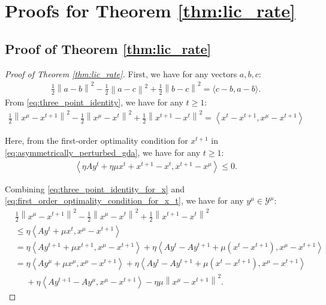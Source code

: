 \documentclass{article}
\newcommand{\Y}{\mathcal{Y}}
\theoremstyle{plain}
\begin{document}
\section{Proofs for Theorem \ref{thm:lic_rate}}
\label{sec:appx_proof_for_lic_rate}
\subsection{Proof of Theorem \ref{thm:lic_rate}}
\label{sec:appx_proof_of_lic_rate}
\begin{proof}[Proof of Theorem \ref{thm:lic_rate}]
    First, we have for any vectors $a, b, c$:
    \begin{align}
        \frac{1}{2}\left\|a - b\right\|^2 - \frac{1}{2}\left\|a - c\right\|^2 + \frac{1}{2}\left\|b - c\right\|^2 = \langle c - b , a - b\rangle.
        \label{eq:three_point_identity}
    \end{align}
    From \eqref{eq:three_point_identity}, we have for any $t\geq 1$:
    \begin{align}
        \frac{1}{2}\left\|x^{\mu} - x^{t+1}\right\|^2 - \frac{1}{2}\left\|x^{\mu} - x^t\right\|^2 + \frac{1}{2}\left\|x^{t+1} - x^t\right\|^2 = \left\langle x^t - x^{t+1}, x^{\mu} - x^{t+1}\right\rangle
        \label{eq:three_point_identity_for_x}
    \end{align}

    Here, from the first-order optimality condition for $x^{t+1}$ in \eqref{eq:asymmetrically_perturbed_gda}, we have for any $t\geq 1$:
    \begin{align}
        \left\langle \eta Ay^t + \eta\mu x^t + x^{t+1} - x^t, x^{t+1} - x^{\mu}\right\rangle \leq 0.
        \label{eq:first_order_optimality_condition_for_x_t}
    \end{align}

    Combining \eqref{eq:three_point_identity_for_x} and \eqref{eq:first_order_optimality_condition_for_x_t}, we have for any $y^{\mu}\in \Y^{\mu}$:
    \begin{align}
        & \frac{1}{2}\left\|x^{\mu} - x^{t+1}\right\|^2 - \frac{1}{2}\left\|x^{\mu} - x^t\right\|^2 + \frac{1}{2}\left\|x^{t+1} - x^t\right\|^2 \nonumber                             \\
        & \leq \eta \left\langle Ay^t + \mu x^t, x^{\mu} - x^{t+1}\right\rangle \nonumber                                                                                                  \\
        & = \eta \left\langle Ay^{t+1} + \mu x^{t+1}, x^{\mu} - x^{t+1}\right\rangle + \eta \left\langle Ay^t - Ay^{t+1} + \mu(x^t - x^{t+1}), x^{\mu} - x^{t+1}\right\rangle \nonumber \\
        & = \eta \left\langle Ay^{\mu} + \mu x^{\mu}, x^{\mu} - x^{t+1}\right\rangle + \eta \left\langle Ay^t - Ay^{t+1} + \mu(x^t - x^{t+1}), x^{\mu} - x^{t+1}\right\rangle \nonumber \\
        & \phantom{=} + \eta \left\langle Ay^{t+1} - Ay^{\mu}, x^{\mu} - x^{t+1}\right\rangle - \eta \mu\left\|x^{\mu} - x^{t+1}\right\|^2.
        \label{eq:three_point_inequality_for_x_tmp}
    \end{align}


\end{proof}
\end{document}

